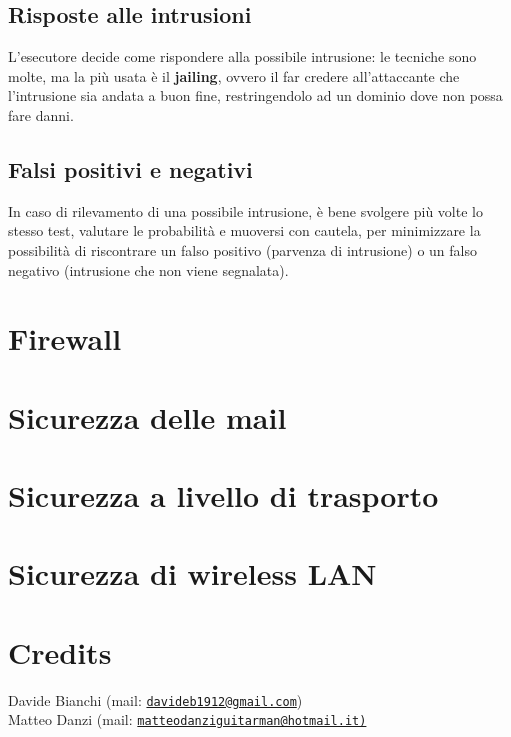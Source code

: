 \documentclass[a4paper, 11pt]{article}
\newcommand{\mail}[1]{\href{mailto:#1}{\texttt{#1}}}
\begin{document}
\begin{multicols}{2}
\subsection{Risposte alle intrusioni}
L'esecutore decide come rispondere alla possibile intrusione: le tecniche sono molte, ma la più usata è il \textbf{jailing}, ovvero il far credere all'attaccante che l'intrusione sia andata a buon fine, restringendolo ad un dominio dove non possa fare danni.

\subsection{Falsi positivi e negativi}
In caso di rilevamento di una possibile intrusione, è bene svolgere più volte lo stesso test, valutare le probabilità e muoversi con cautela, per minimizzare la possibilità di riscontrare un falso positivo (parvenza di intrusione) o un falso negativo (intrusione che non viene segnalata).
	
	\section{Firewall}
	
	\section{Sicurezza delle mail}
	
	\section{Sicurezza a livello di trasporto}
	
	\section{Sicurezza di wireless LAN}
		
		
		
		
		
		
	
	
	
	
	
	
	
	
	
	
	
	
	
	\end{multicols}

	\section{Credits}
	Davide Bianchi (mail: \mail{davideb1912@gmail.com}) \\
	Matteo Danzi (mail: \mail{matteodanziguitarman@hotmail.it)}
	
\end{document}
